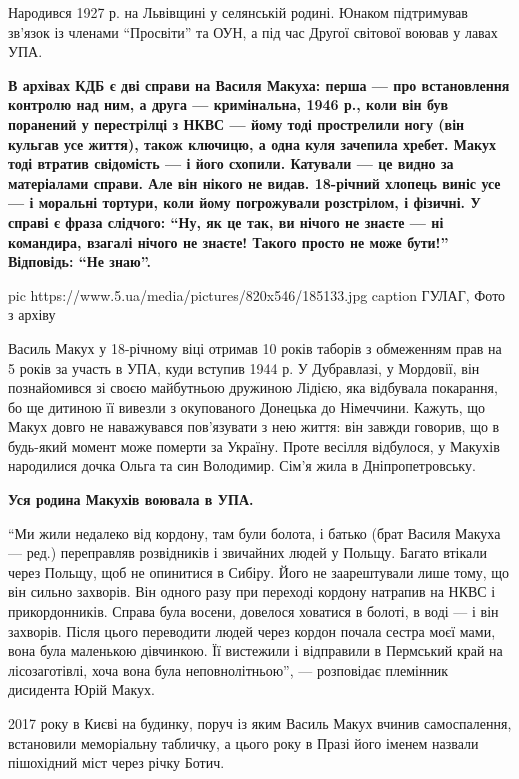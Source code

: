Народився 1927 р. на Львівщині у селянській родині. Юнаком підтримував
зв'язок із членами \enquote{Просвіти} та ОУН, а під час Другої світової воював у
лавах УПА.

{\bfseries
В архівах КДБ є дві справи на Василя Макуха: перша --- про встановлення
контролю над ним, а друга --- кримінальна, 1946 р., коли він був поранений
у перестрілці з НКВС --- йому тоді прострелили ногу (він кульгав усе
життя), також ключицю, а одна куля зачепила хребет. Макух тоді втратив
свідомість --- і його схопили. Катували --- це видно за матеріалами справи.
Але він нікого не видав. 18-річний хлопець виніс усе --- і моральні
тортури, коли йому погрожували розстрілом, і фізичні. У справі є фраза
слідчого: \enquote{Ну, як це так, ви нічого не знаєте --- ні командира, взагалі
нічого не знаєте! Такого просто не може бути!} 
Відповідь: \enquote{Не знаю}.
}

\ifcmt
pic https://www.5.ua/media/pictures/820x546/185133.jpg
caption ГУЛАГ, Фото з архіву
\fi

Василь Макух у 18-річному віці отримав 10 років таборів з обмеженням прав
на 5 років за участь в УПА, куди вступив 1944 р. У Дубравлазі, у Мордовії,
він познайомився зі своєю майбутньою дружиною Лідією, яка відбувала
покарання, бо ще дитиною її вивезли з окупованого Донецька до Німеччини.
Кажуть, що Макух довго не наважувався пов'язувати з нею життя: він завжди
говорив, що в будь-який момент може померти за Україну. Проте весілля
відбулося, у Макухів народилися дочка Ольга та син Володимир. Сім'я жила в
Дніпропетровську.

\textbf{Уся родина Макухів воювала в УПА.}

\enquote{Ми жили недалеко від кордону, там були болота, і батько (брат Василя
Макуха --- ред.) переправляв розвідників і звичайних людей у Польщу. Багато
втікали через Польщу, щоб не опинитися в Сибіру. Його не заарештували лише
тому, що він сильно захворів. Він одного разу при переході кордону
натрапив на НКВС і прикордонників. Справа була восени, довелося ховатися в
болоті, в воді --- і він захворів. Після цього переводити людей через кордон
почала сестра моєї мами, вона була маленькою дівчинкою. Її вистежили і
відправили в Пермський край на лісозаготівлі, хоча вона була
неповнолітньою}, --- розповідає племінник дисидента Юрій Макух.

2017 року в Києві на будинку, поруч із яким Василь Макух вчинив
самоспалення, встановили меморіальну табличку, а цього року в Празі його
іменем назвали пішохідний міст через річку Ботич.

